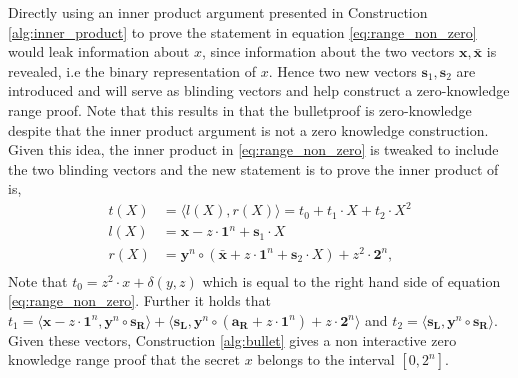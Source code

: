 Directly using an inner product argument presented in Construction \ref{alg:inner_product} to prove the statement  in equation \eqref{eq:range_non_zero} would leak information about $x$, since information about the two vectors $\bm{x},\bm{\bar{x}}$ is revealed, i.e the binary representation of $x$. Hence two new vectors $\bm{s}_1,\bm{s}_2$ are introduced and will serve as blinding vectors and help construct a zero-knowledge range proof. Note that this results in that the bulletproof is zero-knowledge  despite that the inner product argument is not a zero knowledge construction. Given this idea, the inner product in \eqref{eq:range_non_zero} is tweaked to include the two blinding vectors and the new statement is to prove the inner product of is,
\begin{align*}
     t(X) &= \langle  l(X),r(X)\rangle = t_0 + t_1\cdot X + t_2\cdot X^2\\
    l(X) &= \bm{x} -z\cdot \bm{1}^n +\bm{s}_1\cdot X\\
    r(X) &= \bm{y}^n\circ (\bm{\bar{x}} + z \cdot\bm{1}^n + \bm{s}_2\cdot X)+ z^2\cdot\bm{2}^n,\\
\end{align*}
Note that $t_0 = z^2 \cdot x + \delta(y,z)$ which is equal to the right hand side of equation \eqref{eq:range_non_zero}. Further it holds that $t_1 = \langle \bm{x}-z\cdot \bm{1}^n , \bm{y}^n\circ \bm{s_R}\rangle + \langle\bm{s_L},\bm{y}^n\circ (\bm{a_R}+z\cdot\bm{1}^n) + z\cdot \bm{2}^n\rangle$ and $t_2 =\langle \bm{s_L}, \bm{y}^n \circ \bm{s_R}\rangle $. Given these vectors, Construction \ref{alg:bullet} gives a non interactive zero knowledge range proof that the secret $x$ belongs to the interval $[0,2^n]$.

